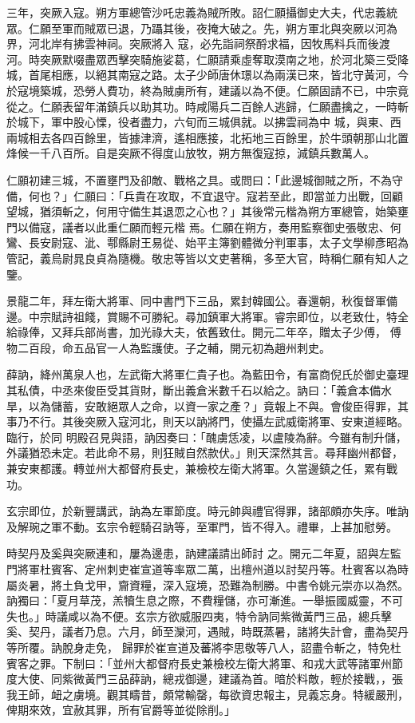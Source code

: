 \begin{pinyinscope}
 三年，突厥入寇。朔方軍總管沙吒忠義為賊所敗。詔仁願攝御史大夫，代忠義統眾。仁願至軍而賊眾已退，乃躡其後，夜掩大破之。先，朔方軍北與突厥以河為界，河北岸有拂雲神祠。突厥將入
 寇，必先詣祠祭酹求福，因牧馬料兵而後渡河。時突厥默啜盡眾西擊突騎施娑葛，仁願請乘虛奪取漠南之地，於河北築三受降城，首尾相應，以絕其南寇之路。太子少師唐休璟以為兩漢已來，皆北守黃河，今於寇境築城，恐勞人費功，終為賊虜所有，建議以為不便。仁願固請不已，中宗竟從之。仁願表留年滿鎮兵以助其功。時咸陽兵二百餘人逃歸，仁願盡擒之，一時斬於城下，軍中股心慄，役者盡力，六旬而三城俱就。以拂雲祠為中
 城，與東、西兩城相去各四百餘里，皆據津濟，遙相應接，北拓地三百餘里，於牛頭朝那山北置烽候一千八百所。自是突厥不得度山放牧，朔方無復寇掠，減鎮兵數萬人。



 仁願初建三城，不置壅門及卻敵、戰格之具。或問曰：「此邊城御賊之所，不為守備，何也？」仁願曰：「兵貴在攻取，不宜退守。寇若至此，即當並力出戰，回顧望城，猶須斬之，何用守備生其退恧之心也？」其後常元楷為朔方軍總管，始築壅門以備寇，議者以此重仁願而輕元楷
 焉。仁願在朔方，奏用監察御史張敬忠、何鸞、長安尉寇、泚、鄠縣尉王易從、始平主簿劉體微分判軍事，太子文學柳彥昭為管記，義烏尉晁良貞為隨機。敬忠等皆以文吏著稱，多至大官，時稱仁願有知人之鑒。



 景龍二年，拜左衛大將軍、同中書門下三品，累封韓國公。春還朝，秋復督軍備邊。中宗賦詩祖餞，賞賜不可勝紀。尋加鎮軍大將軍。睿宗即位，以老致仕，特全給祿俸，又拜兵部尚書，加光祿大夫，依舊致仕。開元二年卒，贈太子少傅，
 傅物二百段，命五品官一人為監護使。子之輔，開元初為趙州刺史。



 薛訥，絳州萬泉人也，左武衛大將軍仁貴子也。為藍田令，有富商倪氏於御史臺理其私債，中丞來俊臣受其貨財，斷出義倉米數千石以給之。訥曰：「義倉本備水旱，以為儲蓄，安敢絕眾人之命，以資一家之產？」竟報上不與。會俊臣得罪，其事乃不行。其後突厥入寇河北，則天以訥將門，使攝左武威衛將軍、安東道經略。臨行，於同
 明殿召見與語，訥因奏曰：「醜虜恁凌，以盧陵為辭。今雖有制升儲，外議猶恐未定。若此命不易，則狂賊自然款伏。」則天深然其言。尋拜幽州都督，兼安東都護。轉並州大都督府長史，兼檢校左衛大將軍。久當邊鎮之任，累有戰功。



 玄宗即位，於新豐講武，訥為左軍節度。時元帥與禮官得罪，諸部頗亦失序。唯訥及解琬之軍不動。玄宗令輕騎召訥等，至軍門，皆不得入。禮畢，上甚加慰勞。



 時契丹及奚與突厥連和，屢為邊患，訥建議請出師討
 之。開元二年夏，詔與左監門將軍杜賓客、定州刺吏崔宣道等率眾二萬，出檀州道以討契丹等。杜賓客以為時屬炎暑，將土負戈甲，齎資糧，深入寇境，恐難為制勝。中書令姚元崇亦以為然。訥獨曰：「夏月草茂，羔犢生息之際，不費糧儲，亦可漸進。一舉振國威靈，不可失也。」時議咸以為不便。玄宗方欲威服四夷，特令訥同紫微黃門三品，總兵擊奚、契丹，議者乃息。六月，師至灤河，遇賊，時既蒸暑，諸將失計會，盡為契丹等所覆。訥脫身走免，
 歸罪於崔宣道及蕃將李思敬等八人，詔盡令斬之，特免杜賓客之罪。下制曰：「並州大都督府長史兼檢校左衛大將軍、和戎大武等諸軍州節度大使、同紫微黃門三品薛訥，總戎御邊，建議為首。暗於料敵，輕於接戰，，張我王師，衄之虜境。觀其疇昔，頗常輸罄，每欲資忠報主，見義忘身。特緩嚴刑，俾期來效，宜赦其罪，所有官爵等並從除削。」




\end{pinyinscope}

